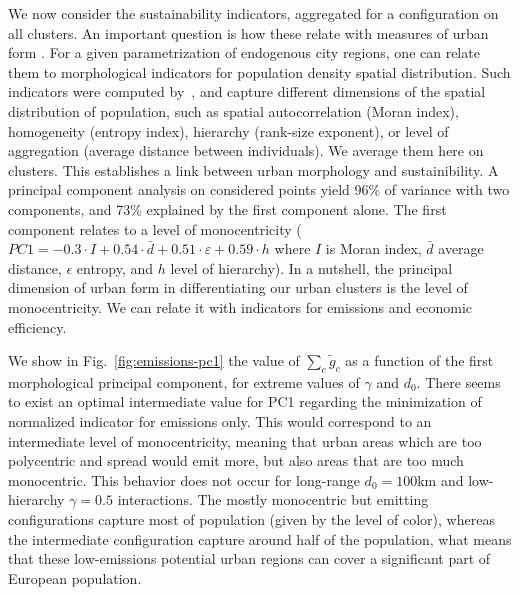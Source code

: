 \documentclass{jimis-en}
\begin{document}
We now consider the sustainability indicators, aggregated for a configuration on all clusters. An important question is how these relate with measures of urban form \citep{le2012urban}. For a given parametrization of endogenous city regions, one can relate them to morphological indicators for population density spatial distribution. Such indicators were computed by~\cite{raimbault2018calibration}, and capture different dimensions of the spatial distribution of population, such as spatial autocorrelation (Moran index), homogeneity (entropy index), hierarchy (rank-size exponent), or level of aggregation (average distance between individuals). We average them here on clusters. This establishes a link between urban morphology and sustainibility. A principal component analysis on considered points yield 96\% of variance with two components, and 73\% explained by the first component alone. The first component relates to a level of monocentricity ($PC1 = -0.3\cdot I + 0.54 \cdot \bar{d} + 0.51\cdot \varepsilon + 0.59 \cdot h$ where $I$ is Moran index, $\bar{d}$ average distance, $\epsilon$ entropy, and $h$ level of hierarchy). In a nutshell, the principal dimension of urban form in differentiating our urban clusters is the level of monocentricity. We can relate it with indicators for emissions and economic efficiency.


We show in Fig.~\ref{fig:emissions-pc1} the value of $\sum_c \tilde{g}_c$ as a function of the first morphological principal component, for extreme values of $\gamma$ and $d_0$. There seems to exist an optimal intermediate value for PC1 regarding the minimization of normalized indicator for emissions only. This would correspond to an intermediate level of monocentricity, meaning that urban areas which are too polycentric and spread would emit more, but also areas that are too much monocentric. This behavior does not occur for long-range $d_0 = 100$km and low-hierarchy $\gamma=0.5$ interactions. The mostly monocentric but emitting configurations capture most of population (given by the level of color), whereas the intermediate configuration capture around half of the population, what means that these low-emissions potential urban regions can cover a significant part of European population.
\end{document}
